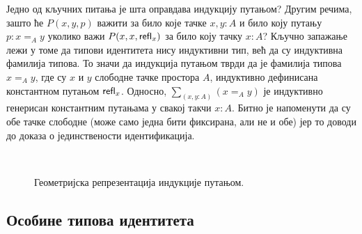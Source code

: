\documentclass[12pt,oneside]{memoir}
\begin{document}
Једно од кључних питања је шта оправдава индукцију путањом? Другим речима, зашто ће $P(x, y, p)$ важити за било које тачке $x, y : A$ и било коју путању $p: x =_A y$ уколико важи $P(x, x, \mathsf{refl}_{x})$ за било коју тачку $x : A$? Кључно запажање лежи у томе да типови идентитета нису индуктивни тип, већ да су индуктивна фамилија типова. То значи да индукција путањом тврди да је фамилија типова $x =_A y$, где су $x$ и $y$ слободне тачке простора $A$, индуктивно дефинисана константном путањом $\mathsf{refl}_{x}$. Односно, $\sum_{(x, y : A)} (x =_A y)$ је индуктивно генерисан константним путањама у свакој такчи $x : A$. Битно је напоменути да су обе тачке слободне (може само једна бити фиксирана, али не и обе) јер то доводи до доказа о јединствености идентификација.

\begin{figure}[!ht]
    \centering\
    \label{fig:path_ind}
    \caption{Геометријска репрезентација индукције путањом.}
\end{figure}

\subsection{Особине типова идентитета}
\end{document}
